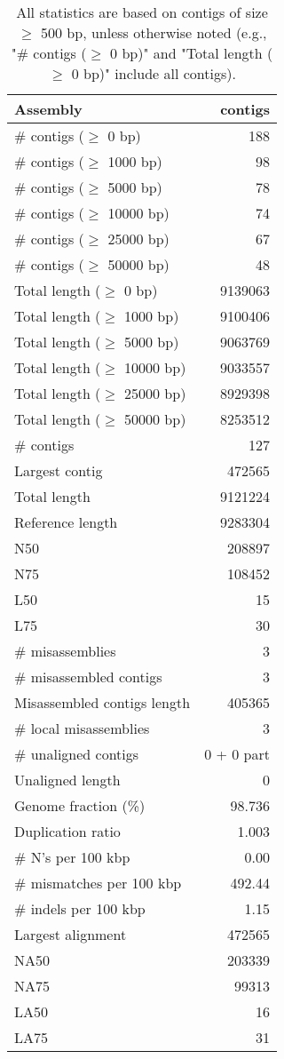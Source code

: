 \documentclass[12pt,a4paper]{article}
\begin{document}
\begin{table}[ht]
\begin{center}
\caption{All statistics are based on contigs of size $\geq$ 500 bp, unless otherwise noted (e.g., "\# contigs ($\geq$ 0 bp)" and "Total length ($\geq$ 0 bp)" include all contigs).}
\begin{tabular}{|l*{1}{|r}|}
\hline
Assembly & contigs \\ \hline
\# contigs ($\geq$ 0 bp) & 188 \\ \hline
\# contigs ($\geq$ 1000 bp) & 98 \\ \hline
\# contigs ($\geq$ 5000 bp) & 78 \\ \hline
\# contigs ($\geq$ 10000 bp) & 74 \\ \hline
\# contigs ($\geq$ 25000 bp) & 67 \\ \hline
\# contigs ($\geq$ 50000 bp) & 48 \\ \hline
Total length ($\geq$ 0 bp) & 9139063 \\ \hline
Total length ($\geq$ 1000 bp) & 9100406 \\ \hline
Total length ($\geq$ 5000 bp) & 9063769 \\ \hline
Total length ($\geq$ 10000 bp) & 9033557 \\ \hline
Total length ($\geq$ 25000 bp) & 8929398 \\ \hline
Total length ($\geq$ 50000 bp) & 8253512 \\ \hline
\# contigs & 127 \\ \hline
Largest contig & 472565 \\ \hline
Total length & 9121224 \\ \hline
Reference length & 9283304 \\ \hline
N50 & 208897 \\ \hline
N75 & 108452 \\ \hline
L50 & 15 \\ \hline
L75 & 30 \\ \hline
\# misassemblies & 3 \\ \hline
\# misassembled contigs & 3 \\ \hline
Misassembled contigs length & 405365 \\ \hline
\# local misassemblies & 3 \\ \hline
\# unaligned contigs & 0 + 0 part \\ \hline
Unaligned length & 0 \\ \hline
Genome fraction (\%) & 98.736 \\ \hline
Duplication ratio & 1.003 \\ \hline
\# N's per 100 kbp & 0.00 \\ \hline
\# mismatches per 100 kbp & 492.44 \\ \hline
\# indels per 100 kbp & 1.15 \\ \hline
Largest alignment & 472565 \\ \hline
NA50 & 203339 \\ \hline
NA75 & 99313 \\ \hline
LA50 & 16 \\ \hline
LA75 & 31 \\ \hline
\end{tabular}
\end{center}
\end{table}
\end{document}
